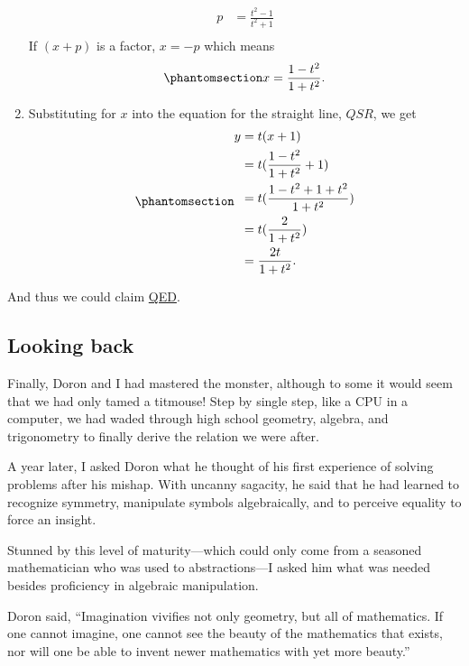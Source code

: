 \documentclass[
  a4paper,
]{article}
\begin{document}
\begin{enumerate}
\[\begin{aligned}
  p &= \frac{t^2 - 1}{t^2 + 1}\\
  \end{aligned}
  \] If \((x + p)\) is a factor, \(x = -p\) which means
  \begin{equation}\phantomsection\label{eq:forx}{
  x = \frac{1 - t^2}{1 + t^2}.
  }\end{equation}
\item
  Substituting for \(x\) into the equation for the straight line,
  \(QSR\), we get \begin{equation}\phantomsection\label{eq:fory}{
  \begin{aligned}
  y &= t(x + 1)\\
  &= t(\frac{1 - t^2}{1 + t^2} + 1)\\
  &= t(\frac{1 - t^2 + 1 + t^2}{1 + t^2})\\
  &= t(\frac{2}{1 + t^2})\\
  &= \frac{2t}{1 + t^2}.
  \end{aligned} 
  }\end{equation}
\end{enumerate}

And thus we could claim
\href{https://en.wikipedia.org/wiki/Q.E.D.}{QED}.

\subsection{Looking back}\label{looking-back}

Finally, Doron and I had mastered the monster, although to some it would
seem that we had only tamed a titmouse! Step by single step, like a CPU
in a computer, we had waded through high school geometry, algebra, and
trigonometry to finally derive the relation we were after.

A year later, I asked Doron what he thought of his first experience of
solving problems after his mishap. With uncanny sagacity, he said that
he had learned to recognize symmetry, manipulate symbols algebraically,
and to perceive equality to force an insight.

Stunned by this level of maturity---which could only come from a
seasoned mathematician who was used to abstractions---I asked him what
was needed besides proficiency in algebraic manipulation.

Doron said, ``Imagination vivifies not only geometry, but all of
mathematics. If one cannot imagine, one cannot see the beauty of the
mathematics that exists, nor will one be able to invent newer
mathematics with yet more beauty.''
\end{document}
